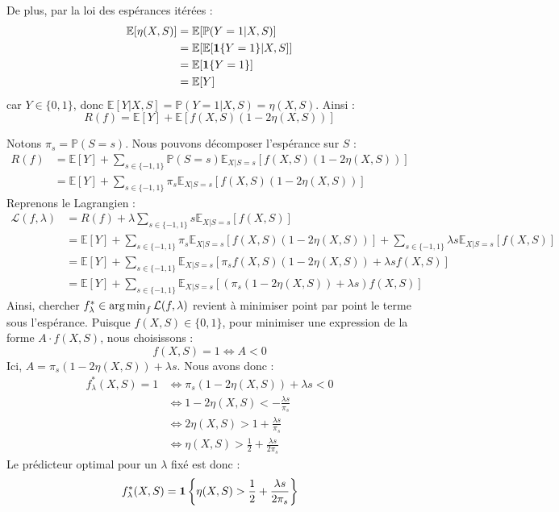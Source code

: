 De plus, par la loi des espérances itérées :
\begin{align*}
    \mathbb{E}[\eta(X,S)] &= \mathbb{E}[\mathbb{P}(Y=1 | X,S)] \\
    &= \mathbb{E}[\mathbb{E}[\mathbf{1}\{Y=1\} | X,S]] \\
    &= \mathbb{E}[\mathbf{1}\{Y=1\}] \\
    &= \mathbb{E}[Y]
\end{align*}
car $Y \in \{0,1\}$, donc $\mathbb{E}[Y|X,S] = \mathbb{P}(Y=1|X,S) = \eta(X,S)$.
Ainsi :
\begin{equation}
    R(f) = \mathbb{E}[Y] + \mathbb{E}\left[ f(X,S) (1 - 2\eta(X,S)) \right]
\end{equation}

Notons $\pi_s = \mathbb{P}(S=s)$. Nous pouvons décomposer l'espérance sur $S$ :
\begin{align*}
    R(f) &= \mathbb{E}[Y] + \sum_{s \in \{-1, 1\}} \mathbb{P}(S=s) \mathbb{E}_{X|S=s}\left[ f(X,S) (1 - 2\eta(X,S)) \right] \\
    &= \mathbb{E}[Y] + \sum_{s \in \{-1, 1\}} \pi_s \mathbb{E}_{X|S=s}\left[ f(X,S) (1 - 2\eta(X,S)) \right]
\end{align*}
Reprenons le Lagrangien :
\begin{align*}
    \mathcal{L}(f, \lambda) &= R(f) + \lambda \sum_{s \in \{-1, 1\}} s \mathbb{E}_{X|S=s}[f(X,S)] \\
    &= \mathbb{E}[Y] + \sum_{s \in \{-1, 1\}} \pi_s \mathbb{E}_{X|S=s}\left[ f(X,S) (1 - 2\eta(X,S)) \right] + \sum_{s \in \{-1, 1\}} \lambda s \mathbb{E}_{X|S=s}[f(X,S)] \\
    &= \mathbb{E}[Y] + \sum_{s \in \{-1, 1\}} \mathbb{E}_{X|S=s} \left[ \pi_s f(X,S) (1 - 2\eta(X,S)) + \lambda s f(X,S) \right] \\
    &= \mathbb{E}[Y] + \sum_{s \in \{-1, 1\}} \mathbb{E}_{X|S=s} \left[ \left( \pi_s (1 - 2\eta(X,S)) + \lambda s \right) f(X,S) \right]
\end{align*}
Ainsi, chercher $f^*_{\lambda} \in \operatorname*{arg\,min}_{f} \mathcal{L}(f, \lambda)$ revient à minimiser point par point le terme sous l'espérance.
Puisque $f(X,S) \in \{0, 1\}$, pour minimiser une expression de la forme $A \cdot f(X,S)$, nous choisissons :
\begin{equation*}
    f(X,S) = 1 \iff A < 0
\end{equation*}
Ici, $A = \pi_s (1 - 2\eta(X,S)) + \lambda s$.
Nous avons donc :
\begin{align*}
    f^*_{\lambda}(X,S) = 1 &\iff \pi_s (1 - 2\eta(X,S)) + \lambda s < 0 \\
    &\iff 1 - 2\eta(X,S) < - \frac{\lambda s}{\pi_s} \\
    &\iff 2\eta(X,S) > 1 + \frac{\lambda s}{\pi_s} \\
    &\iff \eta(X,S) > \frac{1}{2} + \frac{\lambda s}{2\pi_s}
\end{align*}
Le prédicteur optimal pour un $\lambda$ fixé est donc :
\begin{equation}
    f^*_{\lambda}(X,S) = \mathbf{1}\left\{ \eta(X,S) > \frac{1}{2} + \frac{\lambda s}{2\pi_s} \right\}
\end{equation}

